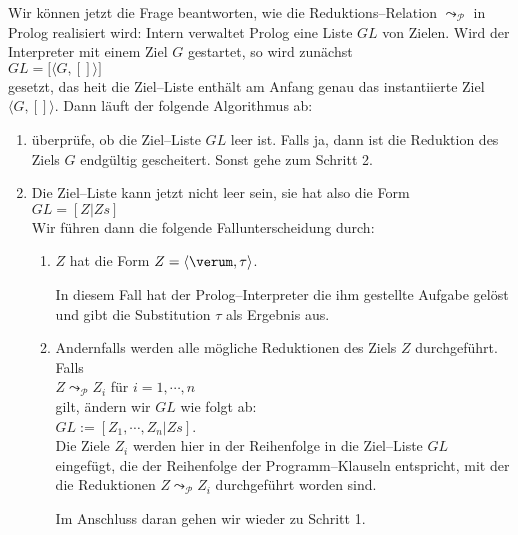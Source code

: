 Wir k\"{o}nnen jetzt die Frage beantworten, wie die Reduktions--Relation
$\leadsto_\mathcal{P}$ in Prolog realisiert wird:  Intern verwaltet Prolog eine Liste
$G\!L$ von Zielen.  Wird der Interpreter mit einem Ziel $G$ gestartet, so wird zun\"{a}chst \\[0.1cm]
\hspace*{1.3cm} $G\!L = \big[ \langle G, [] \rangle \big]$ \\[0.1cm]
gesetzt, das hei\3t die Ziel--Liste enth\"{a}lt am Anfang genau das instantiierte Ziel $\langle G, [] \rangle$.  Dann l\"{a}uft der
folgende Algorithmus ab:
\begin{enumerate}
\item \"{u}berpr\"{u}fe, ob die Ziel--Liste $G\!L$ leer ist. 
      Falls ja, dann ist die Reduktion des Ziels $G$ endg\"{u}ltig gescheitert.
      Sonst gehe zum  Schritt 2.
\item Die Ziel--Liste kann jetzt nicht leer sein, sie hat also die Form \\[0.1cm]
      \hspace*{1.3cm} $G\!L = [ Z | Zs ]$ \\[0.1cm]
      Wir f\"{u}hren dann die folgende Fallunterscheidung durch:
      \begin{enumerate}
      \item $Z$ hat die Form $Z = \langle \verum, \tau \rangle$.

            In diesem Fall hat der Prolog--Interpreter die ihm gestellte Aufgabe gel\"{o}st und
            gibt die Substitution $\tau$ als Ergebnis aus.
      \item Andernfalls werden alle m\"{o}gliche Reduktionen des Ziels $Z$ durchgef\"{u}hrt.  Falls \\[0.1cm]
            \hspace*{1.3cm} $Z \leadsto_\mathcal{P} Z_i$  f\"{u}r $i=1,\cdots,n$ \\[0.1cm]
            gilt,  \"{a}ndern wir $G\!L$ wie folgt ab: \\[0.1cm]
            \hspace*{1.3cm} $G\!L := [ Z_1, \cdots, Z_n | Zs ]$. \\[0.1cm]
            Die Ziele $Z_i$ werden hier in der  Reihenfolge in die Ziel--Liste $G\!L$ eingef\"{u}gt, die der
            Reihenfolge der Programm--Klauseln entspricht, mit der die Reduktionen 
            $Z \leadsto_\mathcal{P} Z_i$
            durchgef\"{u}hrt worden sind.

            Im Anschluss daran gehen wir wieder zu Schritt 1.
      \end{enumerate}
\end{enumerate}
